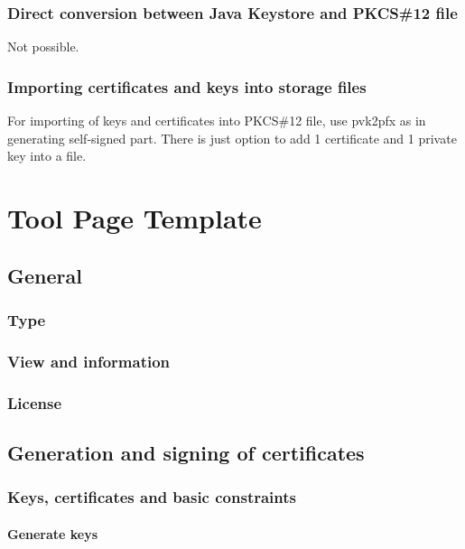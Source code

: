 \documentclass[10pt, a4paper]{report}
\begin{document}
  \subsection{Direct conversion between Java Keystore and PKCS\#12 file}
Not possible.
  \subsection{Importing certificates and keys into storage files}
For importing of keys and certificates into PKCS\#12 file, use pvk2pfx as in generating self-signed part. There is just option to add 1 certificate and 1 private key into a file.

\chapter{Tool Page Template}

\section{General}

  \subsection{Type}
  
  \subsection{View and information}
  
  \subsection{License}

  
\section{Generation and signing of certificates}

  \subsection{Keys, certificates and basic constraints}
  
    \subsubsection{Generate keys}
    
\end{document}
